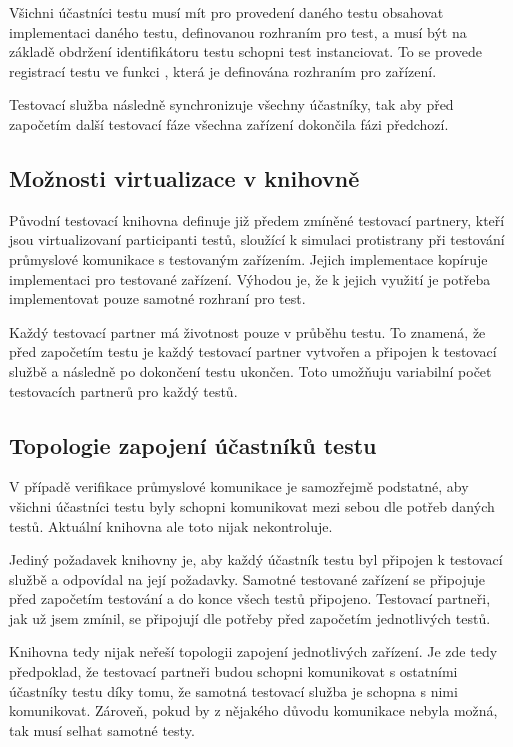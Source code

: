 Všichni účastníci testu musí mít pro provedení daného testu obsahovat implementaci daného testu, definovanou rozhraním pro test, a musí být na základě obdržení identifikátoru testu schopni test instanciovat. To se provede registrací testu ve funkci , která je definována rozhraním pro zařízení.

Testovací služba následně synchronizuje všechny účastníky, tak aby před započetím další testovací fáze všechna zařízení dokončila fázi předchozí. 

\subsection{Možnosti virtualizace v knihovně}

Původní testovací knihovna definuje již předem zmíněné testovací partnery, kteří jsou virtualizovaní participanti testů, sloužící k simulaci protistrany při testování průmyslové komunikace s testovaným zařízením. Jejich implementace kopíruje implementaci pro testované zařízení. Výhodou je, že k jejich využití je potřeba implementovat pouze samotné rozhraní pro test.

Každý testovací partner má životnost pouze v průběhu testu. To znamená, že před započetím testu je každý testovací partner vytvořen a připojen k testovací službě a následně po dokončení testu ukončen. Toto umožňuju variabilní počet testovacích partnerů pro každý testů.

\subsection{Topologie zapojení účastníků testu}

V případě verifikace průmyslové komunikace je samozřejmě podstatné, aby všichni účastníci testu byly schopni komunikovat mezi sebou dle potřeb daných testů. Aktuální knihovna ale toto nijak nekontroluje. 

Jediný požadavek knihovny je, aby každý účastník testu byl připojen k testovací službě a odpovídal na její požadavky. Samotné testované zařízení se připojuje před započetím testování a do konce všech testů připojeno. Testovací partneři, jak už jsem zmínil, se připojují dle potřeby před započetím jednotlivých testů.

Knihovna tedy nijak neřeší topologii zapojení jednotlivých zařízení. Je zde tedy předpoklad, že testovací partneři budou schopni komunikovat s ostatními účastníky testu díky tomu, že samotná testovací služba je schopna s nimi komunikovat. Zároveň, pokud by z nějakého důvodu komunikace nebyla možná, tak musí selhat samotné testy.

